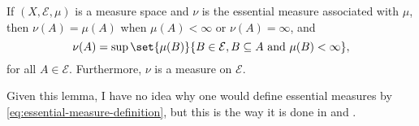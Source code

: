 \documentclass[article, a4paper, 11pt, oneside]{memoir}
\numberwithin{equation}{chapter}
\newcommand{\calE}{\mathcal{E}}
\begin{document}
\begin{lemma}
    \label{thm:essential-measure-equivalent-formula}
    If $(X,\calE,\mu)$ is a measure space and $\nu$ is the essential measure associated with $\mu$, then $\nu(A) = \mu(A)$ when $\mu(A) < \infty$ or $\nu(A) = \infty$, and
    \begin{equation}
        \label{eq:essential-measure-equivalent-formula}
        \nu(A)
            = \sup \set{ \mu(B) }{ B \in \calE, B \subseteq A \text{ and } \mu(B) < \infty },
    \end{equation}
    for all $A \in \calE$. Furthermore, $\nu$ is a measure on $\calE$.
\end{lemma}
%
Given this lemma, I have no idea why one would define essential measures by \eqref{eq:essential-measure-definition}, but this is the way it is done in \textcite{schwartz1973} and \textcite{nlab:radon_measure}.
\end{document}
